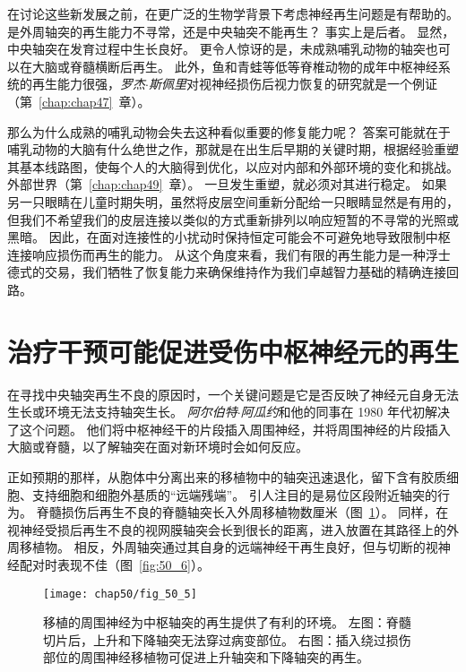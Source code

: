 在讨论这些新发展之前，在更广泛的生物学背景下考虑神经再生问题是有帮助的。
是外周轴突的再生能力不寻常，还是中央轴突不能再生？ 
事实上是后者。
显然，中央轴突在发育过程中生长良好。
更令人惊讶的是，未成熟哺乳动物的轴突也可以在大脑或脊髓横断后再生。
此外，鱼和青蛙等低等脊椎动物的成年中枢神经系统的再生能力很强，\textit{罗杰$\cdot$斯佩里}对视神经损伤后视力恢复的研究就是一个例证（第~\ref{chap:chap47}~章）。


那么为什么成熟的哺乳动物会失去这种看似重要的修复能力呢？
答案可能就在于哺乳动物的大脑有什么绝世之作，那就是在出生后早期的关键时期，根据经验重塑其基本线路图，使每个人的大脑得到优化，以应对内部和外部环境的变化和挑战。
外部世界（第~\ref{chap:chap49}~章）。
一旦发生重塑，就必须对其进行稳定。
如果另一只眼睛在儿童时期失明，虽然将皮层空间重新分配给一只眼睛显然是有用的，但我们不希望我们的皮层连接以类似的方式重新排列以响应短暂的不寻常的光照或黑暗。
因此，在面对连接性的小扰动时保持恒定可能会不可避免地导致限制中枢连接响应损伤而再生的能力。
从这个角度来看，我们有限的再生能力是一种浮士德式的交易，我们牺牲了恢复能力来确保维持作为我们卓越智力基础的精确连接回路。



\section{治疗干预可能促进受伤中枢神经元的再生}

在寻找中央轴突再生不良的原因时，一个关键问题是它是否反映了神经元自身无法生长或环境无法支持轴突生长。
\textit{阿尔伯特$\cdot$阿瓜约}和他的同事在 1980 年代初解决了这个问题。
他们将中枢神经干的片段插入周围神经，并将周围神经的片段插入大脑或脊髓，以了解轴突在面对新环境时会如何反应。


正如预期的那样，从胞体中分离出来的移植物中的轴突迅速退化，留下含有胶质细胞、支持细胞和细胞外基质的“远端残端”。
引人注目的是易位区段附近轴突的行为。
脊髓损伤后再生不良的脊髓轴突长入外周移植物数厘米（图~\ref{fig:50_5}）。
同样，在视神经受损后再生不良的视网膜轴突会长到很长的距离，进入放置在其路径上的外周移植物。
相反，外周轴突通过其自身的远端神经干再生良好，但与切断的视神经配对时表现不佳（图~\ref{fig:50_6}）。


\begin{figure}[htbp]
	\centering
	\texttt{[image: chap50/fig\_50\_5]}
	\caption{移植的周围神经为中枢轴突的再生提供了有利的环境。
		左图：脊髓切片后，上升和下降轴突无法穿过病变部位。
		右图：插入绕过损伤部位的周围神经移植物可促进上升轴突和下降轴突的再生\cite{david1981axonal}。}
	\label{fig:50_5}
\end{figure}


